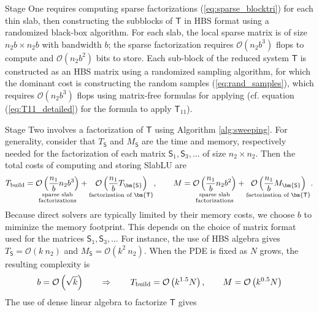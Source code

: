 \documentclass[11pt]{amsart}
\newcommand{\mtx}[1]{\bm{\mathsf{#1}}}
\begin{document}
Stage One requires computing sparse factorizations (\ref{eq:sparse_blocktri}) for each thin slab,
then constructing the subblocks  of $\mtx T$ in HBS format using a randomized black-box algorithm.
For each slab, the local sparse matrix is of size $n_2 b \times n_2 b$ with bandwidth $b$; the sparse factorization
requires $\mathcal O (n_2 b^3)$ flops to compute and $\mathcal O (n_2 b^2)$ bits to store.
Each sub-block of the reduced system $\mtx T$ is constructed as an HBS matrix
using a randomized sampling algorithm, for which the dominant cost is constructing the random samples
 (\ref{eq:rand_samples}), which requires $\mathcal O\left(n_2 b^3 \right)$ flops using matrix-free formulas for applying (cf. equation (\ref{eq:T11_detailed}) for the formula to apply $\mtx T_{11}$).

Stage Two involves a factorization of $\mtx T$ using Algorithm \ref{alg:sweeping}.
For generality, consider that $T_{ \mtx S}$ and $M_{ \mtx S}$ are the time and memory, respectively
needed for the factorization of each matrix $\mtx S_1, \mtx S_3, \dots$ of size $n_2 \times n_2$. Then the total costs
of computing and storing SlabLU are
\begin{equation}
T_{\rm build} = \underset{\substack{\text{sparse slab}\\ \text{factorizations}}}{\mathcal O \left( \frac{n_1} b n_2 b^3 \right)}
 + \underset{\text{factorization of $\mtx T$}}{ \mathcal O \left (\frac {n_1} b T_{\mtx S} \right) },
\qquad M = \underset{\substack{\text{sparse slab}\\ \text{factorizations}}}{\mathcal O \left( \frac{n_1} b n_2 b^2 \right)}
 + \underset{\text{factorization of $\mtx T$}}{ \mathcal O \left (\frac {n_1} b M_{\mtx S} \right) }.
\label{eq:complexity_funcb}
\end{equation}
Because direct solvers are typically 
limited by their memory costs, we choose $b$ to miminize the memory footprint. This depends on the choice of matrix format used for the matrices $\mtx S_1, \mtx S_3, \dots$ 
For instance, the use of HBS algebra gives $T_{\mtx S} = \mathcal O \left (k\ n_2 \right)$ and
 $M_{\mtx S} =\mathcal O \left( k^2\ n_2 \right)$. When the PDE is fixed as $N$ grows, the resulting complexity is
\begin{equation}
b = \mathcal O \left(\sqrt {k} \right)\qquad  \Rightarrow \qquad T_{\rm build} 
= \mathcal O \left(  k^{1.5} N \right), \qquad M = \mathcal O \left(  k^{0.5} N \right)
\label{eq:complexity_hbs}
\end{equation}
The use of dense linear algebra to factorize $\mtx T$ gives
\end{document}
